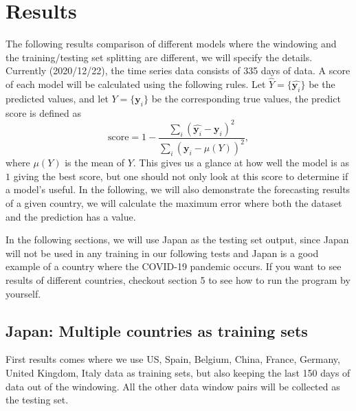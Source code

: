 \documentclass[a4paper,12pt]{article}
\begin{document}
\section{Results}
The following results comparison of different models where the windowing and the training/testing set splitting are different, we will specify the details. Currently (2020/12/22), the time series data consists of 335 days of data. A score of each model will be calculated using the following rules.
Let $\hat{Y} = \{\hat{\mathbf{y}_i}\}$ be the predicted values, and let $Y =\{ \mathbf{y}_i\}$ be the corresponding true values, the predict score is defined as  
\[\text{score}  = 1 - \frac{\sum_i (\hat{\mathbf{y}_i} - \mathbf{y}_i)^2}{\sum_i (\mathbf{y}_i - \mu(Y))^2  },\]
where $\mu(Y)$ is the mean of $Y$. This gives us a glance at how well the model is as $1$ giving the best score, but one should not only look at this score to determine if a model's useful. In the following, we will also demonstrate the forecasting results of a given country, we will calculate the maximum error where both the dataset and the prediction has a value.

In the following sections, we will use Japan as the testing set output, since Japan will not be used in any training in our following tests and Japan is a good example of a country where the COVID-19 pandemic occurs. If you want to see results of different countries, checkout section 5 to see how to run the program by yourself.
\subsection{Japan: Multiple countries as training sets}
First results comes where we use US, Spain, Belgium, China, France, Germany, United Kingdom, Italy data as training sets, but also keeping the last 150 days of data out of the windowing. All the other data window pairs will be collected as the testing set. 
\end{document}
